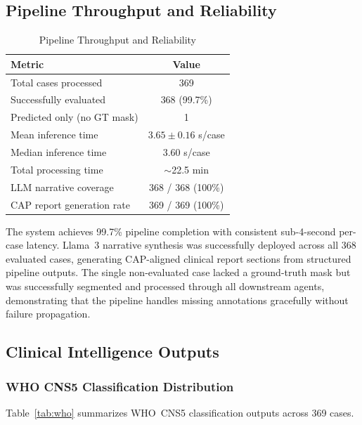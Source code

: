 \documentclass[journal]{IEEEtran}
\begin{document}
\subsection{Pipeline Throughput and Reliability}

\begin{table}[h]
\centering
\caption{Pipeline Throughput and Reliability}
\label{tab:throughput}
\begin{tabular}{lc}
\toprule
\textbf{Metric} & \textbf{Value} \\
\midrule
Total cases processed       & 369 \\
Successfully evaluated      & 368 (99.7\%) \\
Predicted only (no GT mask) & 1 \\
Mean inference time         & $3.65 \pm 0.16$ s/case \\
Median inference time       & $3.60$ s/case \\
Total processing time       & $\sim$22.5 min \\
LLM narrative coverage      & 368 / 368 (100\%) \\
CAP report generation rate  & 369 / 369 (100\%) \\
\bottomrule
\end{tabular}
\end{table}

The system achieves 99.7\% pipeline completion with consistent
sub-4-second per-case latency. Llama~3 narrative synthesis was successfully
deployed across all 368 evaluated cases, generating CAP-aligned clinical
report sections from structured pipeline outputs. The single
non-evaluated case lacked a ground-truth mask but was successfully
segmented and processed through all downstream agents, demonstrating that
the pipeline handles missing annotations gracefully without failure
propagation.

\subsection{Clinical Intelligence Outputs}

\subsubsection{WHO CNS5 Classification Distribution}

Table~\ref{tab:who} summarizes WHO~CNS5 classification outputs across
369 cases.
\end{document}
